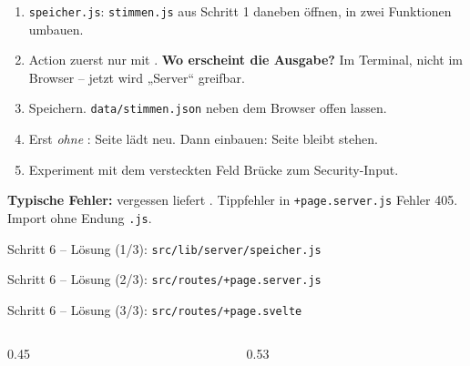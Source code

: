 \begin{lecturer}
\begin{frame}{}
  \footnotesize
  \begin{enumerate}
    \item \texttt{speicher.js}: \texttt{stimmen.js} aus Schritt 1 daneben öffnen, in zwei Funktionen umbauen.
    \item Action zuerst nur mit . \textbf{Wo erscheint die Ausgabe?}
          Im Terminal, nicht im Browser -- jetzt wird „Server“ greifbar.
    \item Speichern. \texttt{data/stimmen.json} neben dem Browser offen lassen.
    \item Erst \emph{ohne} : Seite lädt neu. Dann einbauen: Seite bleibt stehen.
    \item Experiment mit dem versteckten Feld \textarrow{} Brücke zum Security-Input.
  \end{enumerate}
  \textbf{Typische Fehler:}  vergessen \textarrow{}  liefert .
  Tippfehler in \texttt{+page.server.js} \textarrow{} Fehler 405.
  Import ohne Endung \texttt{.js}.
\end{frame}
\end{lecturer}

\begin{loesung}
\begin{frame}[fragile]{Schritt 6 -- Lösung (1/3): \texttt{src/lib/server/speicher.js}}
\end{frame}

\begin{frame}[fragile]{Schritt 6 -- Lösung (2/3): \texttt{src/routes/+page.server.js}}
\end{frame}

\begin{frame}[fragile]{Schritt 6 -- Lösung (3/3): \texttt{src/routes/+page.svelte}}
  \begin{columns}[onlytextwidth,t]
    \begin{column}{0.45\textwidth}
    \end{column}
    \begin{column}{0.53\textwidth}
    \end{column}
  \end{columns}
\end{frame}
\end{loesung}


